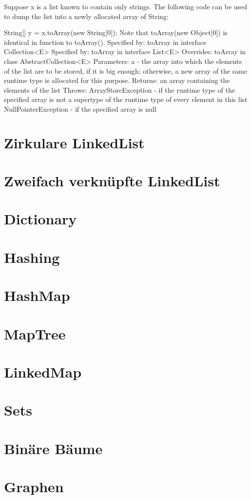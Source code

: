 \documentclass{book}
\begin{document}
Suppose x is a list known to contain only strings. The following code can be used to dump the list into a newly allocated array of String:

String[] y = x.toArray(new String[0]);
Note that toArray(new Object[0]) is identical in function to toArray().
Specified by:
toArray in interface Collection<E>
Specified by:
toArray in interface List<E>
Overrides:
toArray in class AbstractCollection<E>
Parameters:
a - the array into which the elements of the list are to be stored, if it is big enough; otherwise, a new array of the same runtime type is allocated for this purpose.
Returns:
an array containing the elements of the list
Throws:
ArrayStoreException - if the runtime type of the specified array is not a supertype of the runtime type of every element in this list
NullPointerException - if the specified array is null
\section{Zirkulare LinkedList}
\section{Zweifach verknüpfte LinkedList}
\section{Dictionary}
\section{Hashing}
\section{HashMap}
\section{MapTree}
\section{LinkedMap}
\section{Sets}
\section{Binäre Bäume}
\section{Graphen}
\end{document}
